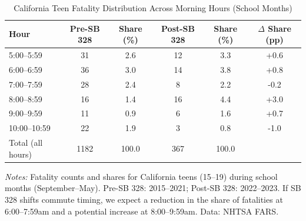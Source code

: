 \begin{table}[htbp]
\centering
\caption{California Teen Fatality Distribution Across Morning Hours (School Months)}
\label{tab:hours}
\begin{threeparttable}
\begin{tabular}{lccccc}
\toprule
Hour & Pre-SB 328 & Share (\%) & Post-SB 328 & Share (\%) & $\Delta$ Share (pp) \\
\midrule
5:00--5:59 & 31 & 2.6 & 12 & 3.3 & +0.6 \\
6:00--6:59 & 36 & 3.0 & 14 & 3.8 & +0.8 \\
7:00--7:59 & 28 & 2.4 & 8 & 2.2 & -0.2 \\
8:00--8:59 & 16 & 1.4 & 16 & 4.4 & +3.0 \\
9:00--9:59 & 11 & 0.9 & 6 & 1.6 & +0.7 \\
10:00--10:59 & 22 & 1.9 & 3 & 0.8 & -1.0 \\
\midrule
Total (all hours) & 1182 & 100.0 & 367 & 100.0 & \\
\bottomrule
\end{tabular}
\begin{tablenotes}[flushleft]
\small
\item \textit{Notes:} Fatality counts and shares for California teens (15--19) during school months (September--May). Pre-SB 328: 2015--2021; Post-SB 328: 2022--2023. If SB 328 shifts commute timing, we expect a reduction in the share of fatalities at 6:00--7:59am and a potential increase at 8:00--9:59am. Data: NHTSA FARS.
\end{tablenotes}
\end{threeparttable}
\end{table}

